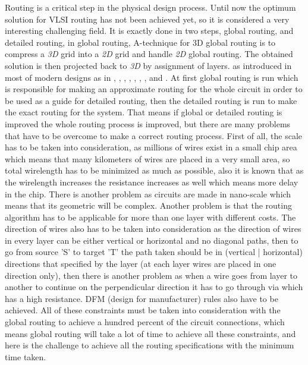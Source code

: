 \documentclass[conference]{IEEEtran}
\begin{document}
Routing is a critical step in the physical design process. Until now the optimum solution for VLSI routing has not been achieved yet, so it is considered a very interesting challenging field. It is exactly done in two steps, global routing, and detailed routing, in global routing, A-technique for 3D global routing is to compress a \textit{3D} grid into a \textit{2D} grid and handle \textit{2D} global routing. The obtained solution is then projected back to \textit{3D} by assignment of layers. as introduced in most of modern designs as in \cite{b1}, \cite{b2}, \cite{b3}, \cite{b4}, \cite{b5}, \cite{b6}, \cite{b7}, and \cite{b8}. At first global routing is run which is responsible for making an approximate routing for the whole circuit in order to be used as a guide for detailed routing, then the detailed routing is run to make the exact routing for the system. That means if global or detailed routing is improved the whole routing process is improved, but there are many problems that have to be overcome to make a correct routing process. First of all, the scale has to be taken into consideration, as millions of wires exist in a small chip area which means that many kilometers of wires are placed in a very small area, so total wirelength has to be minimized as much as possible, also it is known that as the wirelength increases the resistance increases as well which means more delay in the chip. There is another problem as circuits are made in nano-scale which means that its geometric will be complex. Another problem is that the routing algorithm has to be applicable for more than one layer with different costs. The direction of wires also has to be taken into consideration as the direction of wires in every layer can be either vertical or horizontal and no diagonal paths, then to go from source 'S' to target 'T' the path taken should be in (vertical | horizontal) directions that specified by the layer (at each layer wires are placed in one direction only), then there is another problem as when a wire goes from layer to another to continue on the perpendicular direction it has to go through via which has a high resistance. DFM (design for manufacturer) rules also have to be achieved. All of these constraints must be taken into consideration with the global routing to achieve a hundred percent of the circuit connections, which means global routing will take a lot of time to achieve all these constraints, and here is the challenge to achieve all the routing specifications with the minimum time taken. 
\end{document}
